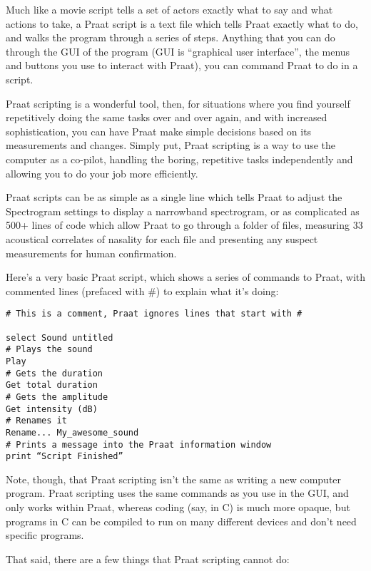 \documentclass[11pt]{article}
\begin{document}
Much like a movie script tells a set of actors exactly what to say and
what actions to take, a Praat script is a text file which tells Praat
exactly what to do, and walks the program through a series of steps.
Anything that you can do through the GUI of the program (GUI is
``graphical user interface'', the menus and buttons you use to interact
with Praat), you can command Praat to do in a script.

Praat scripting is a wonderful tool, then, for situations where you find
yourself repetitively doing the same tasks over and over again, and with
increased sophistication, you can have Praat make simple decisions based
on its measurements and changes. Simply put, Praat scripting is a way to
use the computer as a co-pilot, handling the boring, repetitive tasks
independently and allowing you to do your job more efficiently.

Praat scripts can be as simple as a single line which tells Praat to
adjust the Spectrogram settings to display a narrowband spectrogram, or
as complicated as 500+ lines of code which allow Praat to go through a
folder of files, measuring 33 acoustical correlates of nasality for each
file and presenting any suspect measurements for human confirmation.

Here's a very basic Praat script, which shows a series of commands to
Praat, with commented lines (prefaced with \#) to explain what it's
doing:

\begin{verbatim}
# This is a comment, Praat ignores lines that start with #

select Sound untitled
# Plays the sound
Play
# Gets the duration
Get total duration
# Gets the amplitude
Get intensity (dB)
# Renames it
Rename... My_awesome_sound
# Prints a message into the Praat information window
print “Script Finished”
\end{verbatim}

Note, though, that Praat scripting isn't the same as writing a new
computer program. Praat scripting uses the same commands as you use in
the GUI, and only works within Praat, whereas coding (say, in C) is much
more opaque, but programs in C can be compiled to run on many different
devices and don't need specific programs.

That said, there are a few things that Praat scripting cannot do:
\end{document}
